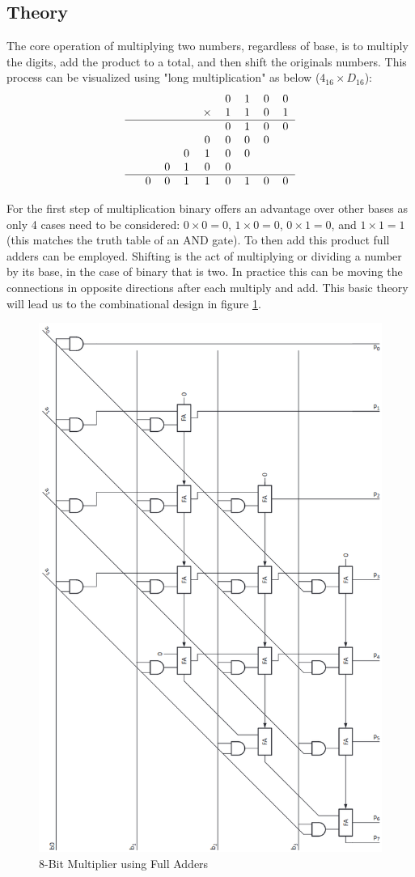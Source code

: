 \documentclass[11pt]{article}
\begin{document}
\subsection{Theory}
The core operation of multiplying two numbers, regardless of base, is to 
multiply the digits, add the product to a total, and then shift the originals numbers\cite{dally}.
This process can be visualized using "long multiplication" as below ($4_{16} \times D_{16}$):
\begin{equation}
    \begin{tabular}{c c c c c c c c c }
                &   &   &   &   & 0 & 1 & 0 & 0 \\
                &   &   &   &  $\times$ & 1 & 1 & 0 & 1 \\
                \hline
                &   &   &   &   & 0 & 1 & 0 & 0 \\
                &   &   &   & 0 & 0 & 0 & 0 &   \\
                &   &   & 0 & 1 & 0 & 0 &   &   \\
                &   & 0 & 1 & 0 & 0 &   &   &   \\
                \hline
                & 0 & 0 & 1 & 1 & 0 & 1 & 0 & 0 \\
    \end{tabular} 
\end{equation}

For the first step of multiplication binary offers an advantage over other bases as only 4 cases need to be considered: 
$0 \times 0 = 0$, $1 \times 0 = 0$, $0 \times 1 = 0$, and $1 \times 1 = 1$ (this matches the truth table of an AND gate).
To then add this product full adders can be employed.
Shifting is the act of multiplying or dividing a number by its base, in the case of binary that is two.
In practice this can be moving the connections in opposite directions after each multiply and add. 
This basic theory will lead us to the combinational design in figure \ref{fig:mult_fa}.

\begin{figure}[H]        
    \centering
    \includegraphics[width=.5\textwidth, origin=c, angle=270]{MultFA.png}
    \caption{8-Bit Multiplier using Full Adders \cite{dally}}
    \label{fig:mult_fa}
\end{figure} 
\end{document}
